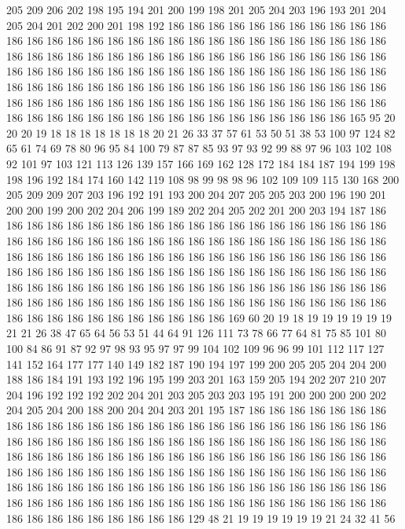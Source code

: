 205 209 206 202 198 195 194 201 200 199 198 201 205 204 203 196 193 201 204 205
204 201 202 200 201 198 192 186 186 186 186 186 186 186 186 186 186 186 186 186
186 186 186 186 186 186 186 186 186 186 186 186 186 186 186 186 186 186 186 186
186 186 186 186 186 186 186 186 186 186 186 186 186 186 186 186 186 186 186 186
186 186 186 186 186 186 186 186 186 186 186 186 186 186 186 186 186 186 186 186
186 186 186 186 186 186 186 186 186 186 186 186 186 186 186 186 186 186 186 186
186 186 186 186 186 186 186 186 186 186 186 186 186 186 186 186 186 186 186 186
186 186 186 186 186 186 186 186 186 186 165 95 20 20 20 19 18 18 18 18
18 18 18 20 21 26 33 37 57 61 53 50 51 38 53 100 97 124 82 65
61 74 69 78 80 96 95 84 100 79 87 87 85 93 97 93 92 99 88 97
96 103 102 108 92 101 97 103 121 113 126 139 157 166 169 162 128 172 184 184
187 194 199 198 198 196 192 184 174 160 142 119 108 98 99 98 98 96 102 109
109 115 130 168 200 205 209 209 207 203 196 192 191 193 200 204 207 205 205 203
200 196 190 201 200 200 199 200 202 204 206 199 189 202 204 205 202 201 200 203
194 187 186 186 186 186 186 186 186 186 186 186 186 186 186 186 186 186 186 186
186 186 186 186 186 186 186 186 186 186 186 186 186 186 186 186 186 186 186 186
186 186 186 186 186 186 186 186 186 186 186 186 186 186 186 186 186 186 186 186
186 186 186 186 186 186 186 186 186 186 186 186 186 186 186 186 186 186 186 186
186 186 186 186 186 186 186 186 186 186 186 186 186 186 186 186 186 186 186 186
186 186 186 186 186 186 186 186 186 186 186 186 186 186 186 186 186 186 186 186
186 186 186 186 186 186 186 186 169 60 20 19 18 19 19 19 19 19 19 21
21 26 38 47 65 64 56 53 51 44 64 91 126 111 73 78 66 77 64 81
75 85 101 80 100 84 86 91 87 92 97 98 93 95 97 97 99 104 102 109
96 96 99 101 112 117 127 141 152 164 177 177 140 149 182 187 190 194 197 199
200 205 205 204 204 200 188 186 184 191 193 192 196 195 199 203 201 163 159 205
194 202 207 210 207 204 196 192 192 192 202 204 201 203 205 203 203 195 191 200
200 200 200 202 204 205 204 200 188 200 204 204 203 201 195 187 186 186 186 186
186 186 186 186 186 186 186 186 186 186 186 186 186 186 186 186 186 186 186 186
186 186 186 186 186 186 186 186 186 186 186 186 186 186 186 186 186 186 186 186
186 186 186 186 186 186 186 186 186 186 186 186 186 186 186 186 186 186 186 186
186 186 186 186 186 186 186 186 186 186 186 186 186 186 186 186 186 186 186 186
186 186 186 186 186 186 186 186 186 186 186 186 186 186 186 186 186 186 186 186
186 186 186 186 186 186 186 186 186 186 186 186 186 186 186 186 186 186 186 186
186 186 186 186 186 186 129 48 21 19 19 19 19 19 19 21 24 32 41 56

